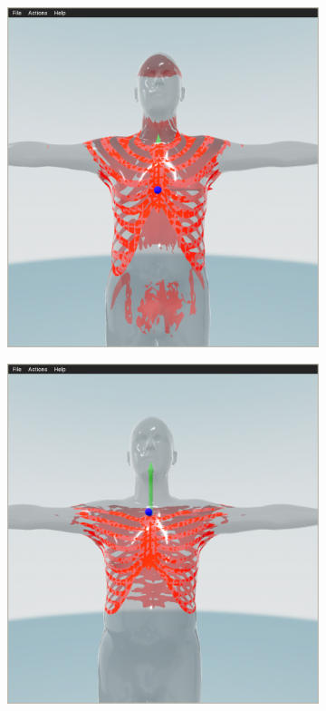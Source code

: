 \begin{figure}[H]
     \centering
     \begin{subfigure}[b]{0.3\textwidth}
         \centering
        \includegraphics[width=\textwidth]{images/body_estimation/radially_proj.png}
         \caption{}
         \label{}
     \end{subfigure}
     \hfill
     \begin{subfigure}[b]{0.3\textwidth}
         \centering
         \includegraphics[width=\textwidth]{images/body_estimation/cylindrical_proj.png}

\end{subfigure}
\end{figure}

